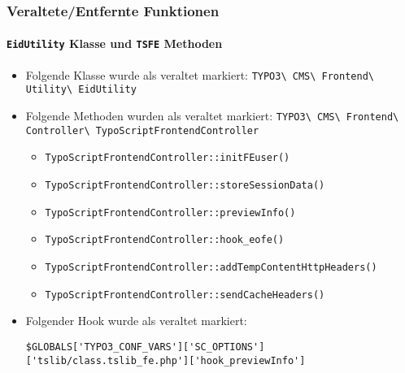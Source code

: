 
\begin{frame}[fragile]
	\frametitle{Veraltete/Entfernte Funktionen}
	\framesubtitle{\texttt{EidUtility} Klasse und \texttt{TSFE} Methoden}

	\lstset{basicstyle=\tiny\ttfamily}

	\begin{itemize}
		\item Folgende Klasse wurde als veraltet markiert:\newline
			\smaller\texttt{TYPO3\textbackslash
				CMS\textbackslash
				Frontend\textbackslash
				Utility\textbackslash
				EidUtility}\normalsize

		\item Folgende Methoden wurden als veraltet markiert:\newline
			\smaller\texttt{TYPO3\textbackslash
				CMS\textbackslash
				Frontend\textbackslash
				Controller\textbackslash
				TypoScriptFrontendController}\normalsize

				\begin{itemize}\smaller
					\item \texttt{TypoScriptFrontendController::initFEuser()}
					\item \texttt{TypoScriptFrontendController::storeSessionData()}
					\item \texttt{TypoScriptFrontendController::previewInfo()}
					\item \texttt{TypoScriptFrontendController::hook\_eofe()}
					\item \texttt{TypoScriptFrontendController::addTempContentHttpHeaders()}
					\item \texttt{TypoScriptFrontendController::sendCacheHeaders()}
				\end{itemize}

			\item Folgender Hook wurde als veraltet markiert:

				\begin{lstlisting}
$GLOBALS['TYPO3_CONF_VARS']['SC_OPTIONS']['tslib/class.tslib_fe.php']['hook_previewInfo']
				\end{lstlisting}

	\end{itemize}

\end{frame}

